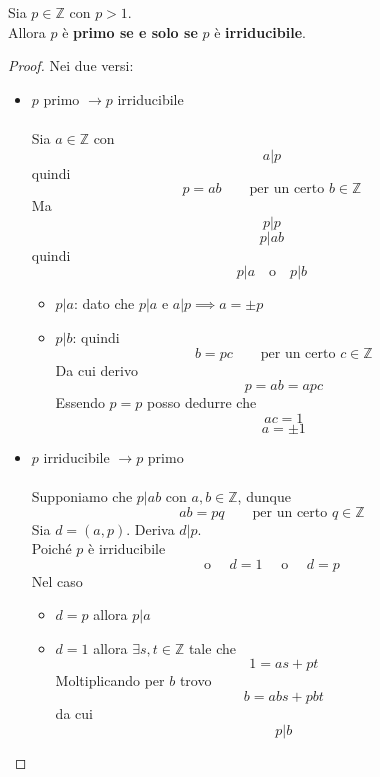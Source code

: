 \documentclass[a4paper,12pt, oneside]{book}
\begin{document}
\begin{teorema}
	Sia $p \in \mathbb{Z}$ con $p > 1$.\\
	Allora $p$ è \textbf{primo se e solo se} $p$ è \textbf{irriducibile}.

	\begin{proof}Nei due versi:
		\begin{itemize}
			\item $p$ primo $\rightarrow p$ irriducibile\\\\
			      Sia $a \in \mathbb{Z}$ con $$a|p$$ quindi $$p=ab \qquad \mbox{per un certo } b \in \mathbb{Z}$$
			      Ma $$p|p$$
			      $$p|ab$$ quindi
			      $$p|a \quad \mbox{o} \quad p|b$$
			      \begin{itemize}
				      \item $p|a$: dato che $p|a$ e $a|p \implies a = \pm p$
				      \item $p|b$: quindi
				            $$b=pc \qquad \mbox{per un certo } c \in \mathbb{Z}$$
				            Da cui derivo $$p=ab=apc$$
				            Essendo $p=p$ posso dedurre che
				            $$ac=1$$
				            $$a=\pm 1$$
			      \end{itemize}
			\item $p$ irriducibile $\rightarrow p$ primo\\\\
			      Supponiamo che $p|ab$ con $a,b \in \mathbb{Z}$, dunque
			      $$ab=pq \qquad \mbox{per un certo } q \in \mathbb{Z}$$
			      Sia $d=(a,p)$.
			      Deriva $d|p$.\\
			      Poiché $p$ è irriducibile
			      $$\mbox{o }\quad d=1 \quad\mbox{ o }\quad d=p$$
			      Nel caso \begin{itemize}
				      \item $d=p$ allora $p|a$
				      \item $d=1$ allora $\exists s,t \in \mathbb{Z}$
				            tale che $$1=as+pt$$
				            Moltiplicando per $b$ trovo
				            $$b = abs + pbt$$
				            da cui $$p|b$$
			      \end{itemize}
		\end{itemize}
	\end{proof}
\end{teorema}
\end{document}
